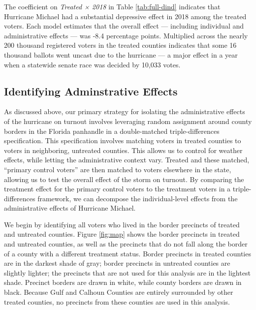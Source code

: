 \documentclass[
  12pt,
]{article}
\begin{document}
\begin{singlespace}

\end{singlespace}

The coefficient on \emph{Treated × 2018} in Table \ref{tab:full-dind} indicates that Hurricane Michael had a substantial depressive effect in 2018 among the treated voters. Each model estimates that the overall effect --- including individual and administrative effects --- was -8.4 percentage points. Multiplied across the nearly 200 thousand registered voters in the treated counties indicates that some 16 thousand ballots went uncast due to the hurricane --- a major effect in a year when a statewide senate race was decided by 10,033 votes.

\hypertarget{identifying-adminstrative-effects}{%
\subsection*{Identifying Adminstrative Effects}\label{identifying-adminstrative-effects}}

As discussed above, our primary strategy for isolating the administrative effects of the hurricane on turnout involves leveraging random assignment around county borders in the Florida panhandle in a double-matched triple-differences specification. This specification involves matching voters in treated counties to voters in neighboring, untreated counties. This allows us to control for weather effects, while letting the administrative context vary. Treated and these matched, ``primary control voters'' are then matched to voters elsewhere in the state, allowing us to test the overall effect of the storm on turnout. By comparing the treatment effect for the primary control voters to the treatment voters in a triple-differences framework, we can decompose the individual-level effects from the administrative effects of Hurricane Michael.

We begin by identifying all voters who lived in the border precincts of treated and untreated counties. Figure \ref{fig:map} shows the border precincts in treated and untreated counties, as well as the precincts that do not fall along the border of a county with a different treatment status. Border precincts in treated counties are in the darkest shade of gray; border precincts in untreated counties are slightly lighter; the precincts that are not used for this analysis are in the lightest shade. Precinct borders are drawn in white, while county borders are drawn in black. Because Gulf and Calhoun Counties are entirely surrounded by other treated counties, no precincts from these counties are used in this analysis.
\end{document}
